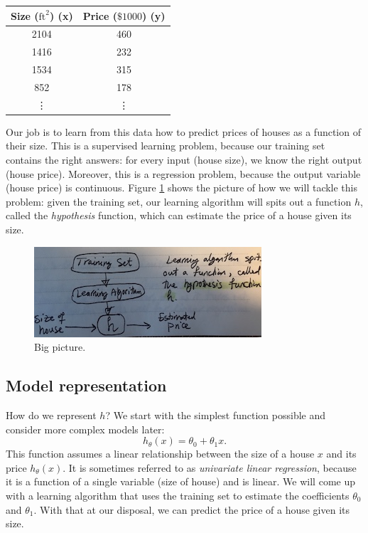 \documentclass{article}
\theoremstyle{definition}
\begin{document}
\begin{center}
\begin{tabular}{ |c|c| } 
 \hline
 Size ($\text{ft}^2$) (x) & Price ($\$1000$) (y) \\
 \hline
 2104 & 460 \\
 1416 & 232 \\
 1534 & 315 \\
 852 & 178 \\
 \vdots & \vdots \\
 \hline
\end{tabular}
\end{center}

Our job is to learn from this data how to predict prices of houses as a function of their size. This is a supervised learning problem, because our training set contains the right answers: for every input (house size), we know the right output (house price). Moreover, this is a regression problem, because the output variable (house price) is continuous. Figure \ref{linreg-bigpic} shows the picture of how we will tackle this problem: given the training set, our learning algorithm will spits out a function $h$, called the \textit{hypothesis} function, which can estimate the price of a house given its size.

\begin{figure}[ht]
\centering
\includegraphics[scale=0.8]{images/lin_reg/big-picture.jpg}
\caption{Big picture.}
\label{linreg-bigpic}
\end{figure}

\subsection{Model representation}
How do we represent $h$? We start with the simplest function possible and consider more complex models later:
\begin{equation}
    h_{\theta}(x) = \theta_0 + \theta_1 x.
    \label{linreg-eq:univar-hypothesis}
\end{equation}
This function assumes a linear relationship between the size of a house $x$ and its price $h_{\theta}(x)$. It is sometimes referred to as \textit{univariate linear regression}, because it is a function of a single variable (size of house) and is linear. We will come up with a learning algorithm that uses the training set to estimate the coefficients $\theta_0$ and $\theta_1$. With that at our disposal, we can predict the price of a house given its size. 
\end{document}
